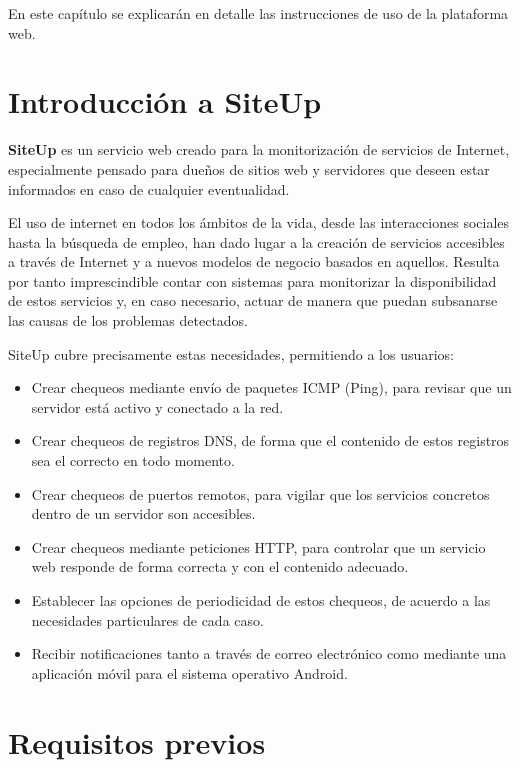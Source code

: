 En este capítulo se explicarán en detalle las instrucciones de uso de la
plataforma web.

\section{Introducción a SiteUp}

\textbf{SiteUp} es un servicio web creado para la monitorización de servicios de
Internet, especialmente pensado para dueños de sitios web y servidores que
deseen estar informados en caso de cualquier eventualidad.

El uso de internet en todos los ámbitos de la vida, desde las interacciones
sociales hasta la búsqueda de empleo, han dado lugar a la creación de servicios
accesibles a través de Internet y a nuevos modelos de negocio basados en
aquellos. Resulta por tanto imprescindible contar con sistemas para monitorizar
la disponibilidad de estos servicios y, en caso necesario, actuar de manera que
puedan subsanarse las causas de los problemas detectados.

SiteUp cubre precisamente estas necesidades, permitiendo a los usuarios:

\begin{itemize}
\item Crear chequeos mediante envío de paquetes ICMP (Ping), para revisar que un
  servidor está activo y conectado a la red.
\item Crear chequeos de registros DNS, de forma que el contenido de estos
  registros sea el correcto en todo momento.
\item Crear chequeos de puertos remotos, para vigilar que los servicios
  concretos dentro de un servidor son accesibles.
\item Crear chequeos mediante peticiones HTTP, para controlar que un servicio
  web responde de forma correcta y con el contenido adecuado.
\item Establecer las opciones de periodicidad de estos chequeos, de acuerdo a
  las necesidades particulares de cada caso.
\item Recibir notificaciones tanto a través de correo electrónico como mediante
  una aplicación móvil para el sistema operativo Android.
\end{itemize}

\section{Requisitos previos}

